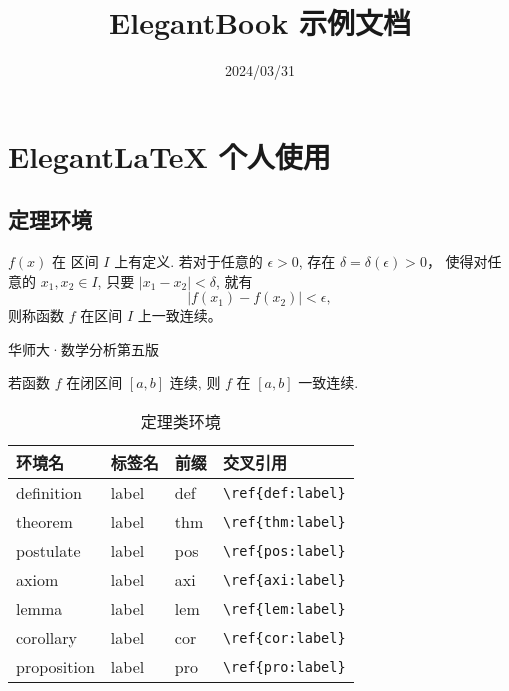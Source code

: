 \documentclass[lang=cn]{elegantbook}
\title{ElegantBook 示例文档}
\date{2024/03/31}
\begin{document}
\maketitle


\frontmatter
\tableofcontents


\mainmatter
\chapter{Elegant\LaTeX{} 个人使用}

\section{定理环境}

\begin{definition}[一致连续]\label{def:1}
  $f(x)$ 在 区间 $I$ 上有定义. 若对于任意的 $\epsilon > 0$, 存在 $\delta = \delta(\epsilon) > 0$，%
  使得对任意的 $x_1, x_2\in I$, 只要 $|x_1 - x_2| < \delta$, 就有
  \[
    |f(x_1) - f(x_2)| < \epsilon ,
  \]
  则称函数 $f$ 在区间 $I$ 上一致连续。
  \begin{flushright}
    华师大·数学分析第五版
  \end{flushright}
\end{definition}

\begin{theorem}[一致连续性定理]\label{thm:1}
  若函数 $f$ 在闭区间 $[a,b]$ 连续, 则 $f$ 在 $[a,b]$ 一致连续.
\end{theorem}

\begin{table}[htbp]
  \centering
  \caption{定理类环境}
    \begin{tabular}{llll}
    \toprule
    环境名 & 标签名 & 前缀 & 交叉引用 \\
    \midrule
    definition & label & def   & \lstinline|\ref{def:label}| \\
    theorem & label & thm   & \lstinline|\ref{thm:label}| \\
    postulate & label & pos & \lstinline|\ref{pos:label}| \\
    axiom & label & axi & \lstinline|\ref{axi:label}|\\
    lemma & label & lem   & \lstinline|\ref{lem:label}| \\
    corollary & label & cor   & \lstinline|\ref{cor:label}| \\
    proposition & label & pro   & \lstinline|\ref{pro:label}| \\
    \bottomrule
    \end{tabular}%
  \label{tab:theorem-class}%
\end{table}%
\end{document}
